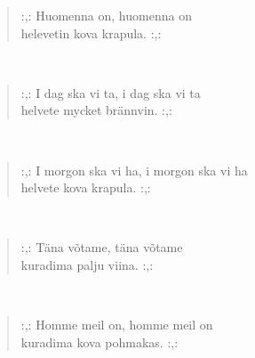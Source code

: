 \noindent\begin{minipage}{\linewidth}
\begin{verse}
	\hspace{0pt-\widthof{:,: }}:,: Huomenna on, huomenna on\\
	helevetin kova krapula. :,:\\
\end{verse}
\end{minipage}\\[10pt]
\noindent\begin{minipage}{\linewidth}
\begin{verse}
	\hspace{0pt-\widthof{:,: }}:,: I dag ska vi ta, i dag ska vi ta\\
	helvete mycket brännvin. :,:\\
\end{verse}
\end{minipage}\\[10pt]
\noindent\begin{minipage}{\linewidth}
\begin{verse}
	\hspace{0pt-\widthof{:,: }}:,: I morgon ska vi ha, i morgon ska vi ha\\
	helvete kova krapula. :,:\\
\end{verse}
\end{minipage}\\[10pt]
\noindent\begin{minipage}{\linewidth}
\begin{verse}
	\hspace{0pt-\widthof{:,: }}:,: Täna võtame, täna võtame\\
	kuradima palju viina. :,:\\
\end{verse}
\end{minipage}\\[10pt]
\noindent\begin{minipage}{\linewidth}
\begin{verse}
	\hspace{0pt-\widthof{:,: }}:,: Homme meil on, homme meil on\\
	kuradima kova pohmakas. :,:\\
\end{verse}
\end{minipage}\\[10pt]
%
%

